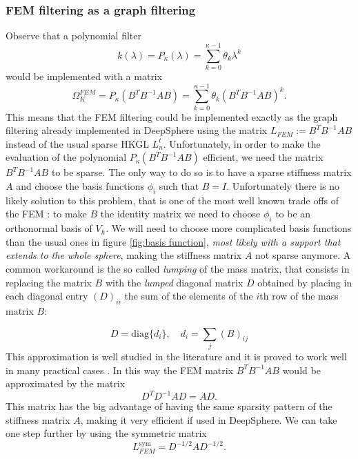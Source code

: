 \subsubsection{FEM filtering as a graph filtering}
Observe that a polynomial filter
$$
k(\lambda)=P_\kappa(\lambda) = \sum_{k=0}^{\kappa-1} \theta_k \lambda^k
$$
would be implemented with a matrix
$$
\Omega_K^{FEM} = P_\kappa(B^TB^{-1}AB) = \sum_{k=0}^{\kappa-1} \theta_k (B^TB^{-1}AB)^k.
$$
This means that the FEM filtering could be implemented exactly as the graph filtering already implemented in DeepSphere using the matrix $L_{FEM} := B^TB^{-1}AB$ instead of the usual sparse HKGL $L_n^t$. Unfortunately, in order to make the evaluation of the polynomial $P_\kappa(B^TB^{-1}AB)$ efficient, we need the matrix $B^TB^{-1}AB$ to be sparse. The only way to do so is to have a sparse stiffness matrix $A$ and choose the basis functions $\phi_i$ such that $B=I$. Unfortunately there is no likely solution to this problem, that is one of the most well known trade offs of the FEM \cite{Strang}: to make $B$ the identity matrix we need to choose $\phi_i$ to be an orthonormal basis of $V_h$. We will need to choose more complicated basis functions than the usual ones in figure \ref{fig:basis function}, \textit{most likely with a support that extends to the whole sphere}, making the stiffness matrix $A$ not sparse anymore. A common workaround \cite{Strang} is the so called \textit{lumping} of the mass matrix, that consists in replacing the matrix $B$ with the \textit{lumped} diagonal matrix $D$ obtained by placing in each diagonal entry $(D)_{ii}$ the sum of the elements of the $i$th row of the mass matrix $B$:

\begin{equation}\label{eq:lumping}
D = \text{diag}\{d_i\},\quad d_i = \sum_j (B)_{ij}
\end{equation}
This approximation is well studied in the literature and it is proved to work well in many practical cases \cite{Quarteroni:1639539}. In this way the FEM matrix $B^TB^{-1}AB$ would be approximated by the matrix
$$
D^TD^{-1}AD = AD.
$$
This matrix has the big advantage of having the same sparsity pattern of the stiffness matrix $A$, making it very efficient if used in DeepSphere. We can take one step further by using the symmetric matrix
$$
L_{FEM}^{\text{sym}} = D^{-1/2}AD^{-1/2}.
$$

